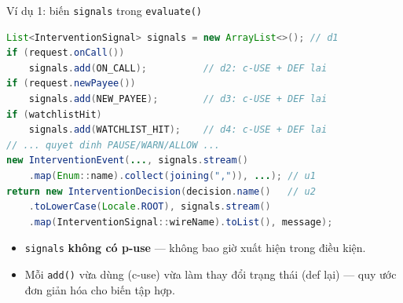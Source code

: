 \documentclass[aspectratio=169,12pt]{beamer}
\begin{document}
\begin{frame}[fragile,shrink=8]{Ví dụ 1: biến \texttt{signals} trong \texttt{evaluate()}}
\begin{lstlisting}[language=java,basicstyle=\ttfamily\footnotesize]
List<InterventionSignal> signals = new ArrayList<>(); // d1
if (request.onCall())
    signals.add(ON_CALL);          // d2: c-USE + DEF lai
if (request.newPayee())
    signals.add(NEW_PAYEE);        // d3: c-USE + DEF lai
if (watchlistHit)
    signals.add(WATCHLIST_HIT);    // d4: c-USE + DEF lai
// ... quyet dinh PAUSE/WARN/ALLOW ...
new InterventionEvent(..., signals.stream()
    .map(Enum::name).collect(joining(",")), ...); // u1
return new InterventionDecision(decision.name()   // u2
    .toLowerCase(Locale.ROOT), signals.stream()
    .map(InterventionSignal::wireName).toList(), message);
\end{lstlisting}

  \begin{itemize}
    \item \texttt{signals} \textbf{không có p-use} --- không bao giờ
          xuất hiện trong điều kiện.
    \item Mỗi \texttt{add()} vừa dùng (c-use) vừa làm thay đổi trạng thái
          (def lại) --- quy ước đơn giản hóa cho biến tập hợp.
  \end{itemize}
\end{frame}
\end{document}
